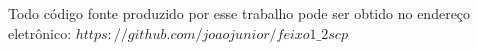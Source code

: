 \documentclass{proc}
\begin{document}
Todo código fonte produzido por esse trabalho pode ser obtido no endereço eletrônico: $https://github.com/joaojunior/feixo1\_2scp$






\end{document}
